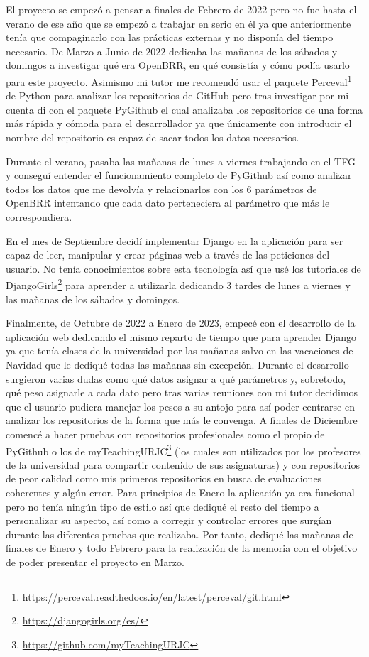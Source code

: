 \documentclass[a4paper, 12pt]{book}
\begin{document}
El proyecto se empezó a pensar a finales de Febrero de 2022 pero no fue hasta el verano de ese año que se empezó a trabajar en serio en él ya que anteriormente tenía que compaginarlo con las prácticas externas y no disponía del tiempo necesario. 
De Marzo a Junio de 2022 dedicaba las mañanas de los sábados y domingos a investigar qué era OpenBRR, en qué consistía y cómo podía usarlo para este proyecto. Asimismo mi tutor me recomendó usar el paquete Perceval\footnote{\url{https://perceval.readthedocs.io/en/latest/perceval/git.html}} de Python para analizar los repositorios de GitHub pero tras investigar por mi cuenta di con el paquete PyGithub el cual analizaba los repositorios de una forma más rápida y cómoda para el desarrollador ya que únicamente con introducir el nombre del repositorio es capaz de sacar todos los datos necesarios.

Durante el verano, pasaba las mañanas de lunes a viernes trabajando en el TFG y conseguí entender el funcionamiento completo de PyGithub así como analizar todos los datos que me devolvía y relacionarlos con los 6 parámetros de OpenBRR intentando que cada dato perteneciera al parámetro que más le correspondiera.

En el mes de Septiembre decidí implementar Django en la aplicación para ser capaz de leer, manipular y crear páginas web a través de las peticiones del usuario. No tenía conocimientos sobre esta tecnología así que usé los tutoriales de DjangoGirls\footnote{\url{https://djangogirls.org/es/}}\cite{website:DjangoGirls} para aprender a utilizarla dedicando 3 tardes de lunes a viernes y las mañanas de los sábados y domingos.

Finalmente, de Octubre de 2022 a Enero de 2023, empecé con el desarrollo de la aplicación web dedicando el mismo reparto de tiempo que para aprender Django ya que tenía clases de la universidad por las mañanas salvo en las vacaciones de Navidad que le dediqué todas las mañanas sin excepción. Durante el desarrollo surgieron varias dudas como qué datos asignar a qué parámetros y, sobretodo, qué peso asignarle a cada dato pero tras varias reuniones con mi tutor decidimos que el usuario pudiera manejar los pesos a su antojo para así poder centrarse en analizar los repositorios de la forma que más le convenga.
A finales de Diciembre comencé a hacer pruebas con repositorios profesionales como el propio de PyGithub o los de myTeachingURJC\footnote{\url{https://github.com/myTeachingURJC}} (los cuales son utilizados por los profesores de la universidad para compartir contenido de sus asignaturas) y con repositorios de peor calidad como mis primeros repositorios en busca de evaluaciones coherentes y algún error. Para principios de Enero la aplicación ya era funcional pero no tenía ningún tipo de estilo así que dediqué el resto del tiempo a personalizar su aspecto, así como a corregir y controlar errores que surgían durante las diferentes pruebas que realizaba.
Por tanto, dediqué las mañanas de finales de Enero y todo Febrero para la realización de la memoria con el objetivo de poder presentar el proyecto en Marzo.
\end{document}
